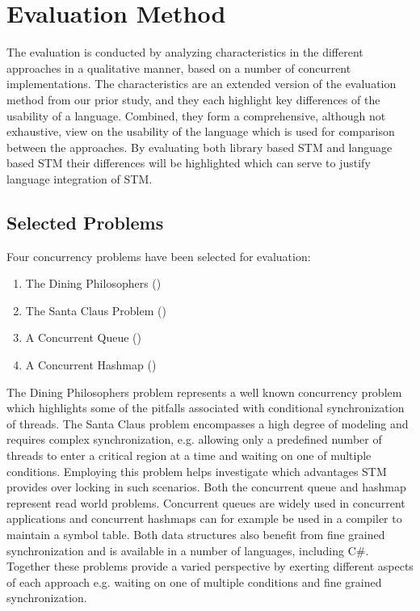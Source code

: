 \section{Evaluation Method}\label{sec:eval_approach}
The evaluation is conducted by analyzing  characteristics in the different approaches in a qualitative manner, based on a number of concurrent implementations. The characteristics are an extended version of the evaluation method from our prior study\cite[p. 15-21]{dpt907e14trending}, and they each highlight key differences of the usability of a language. Combined, they form a comprehensive, although not exhaustive, view on the usability of the language which is used for comparison between the approaches. By evaluating both library based \ac{STM} and language based \ac{STM} their differences will be highlighted which can serve to justify language integration of \ac{STM}.

\subsection{Selected Problems}
Four concurrency problems have been selected for evaluation:
\begin{enumerate}
\item The Dining Philosophers ()
\item The Santa Claus Problem ()
\item A Concurrent Queue ()
\item A Concurrent Hashmap ()
\end{enumerate}
The Dining Philosophers problem represents a well known concurrency problem which highlights some of the pitfalls associated with conditional synchronization of threads. The Santa Claus problem encompasses a high degree of modeling and requires complex synchronization, e.g. allowing only a predefined number of threads to enter a critical region at a time and waiting on one of multiple conditions. Employing this problem helps investigate which advantages \ac{STM} provides over locking in such scenarios. Both the concurrent queue and hashmap represent read world problems. Concurrent queues are widely used in concurrent applications\cite{michael1996simple} and concurrent hashmaps can for example be used in a compiler to maintain a symbol table\cite{cormen2009introduction}. Both data structures also benefit from fine grained synchronization and is available in a number of languages, including C\#. Together these problems provide a varied perspective by exerting different aspects of each approach e.g. waiting on one of multiple conditions and fine grained synchronization.


